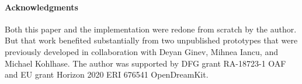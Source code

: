 \paragraph{Acknowledgments}
Both this paper and the \mmttex implementation were redone from scratch by the author.
But that work benefited substantially from two unpublished prototypes that were previously developed in collaboration with Deyan Ginev, Mihnea Iancu, and Michael Kohlhase.
The author was supported by DFG grant RA-18723-1 OAF and EU grant Horizon 2020 ERI 676541 OpenDreamKit.






